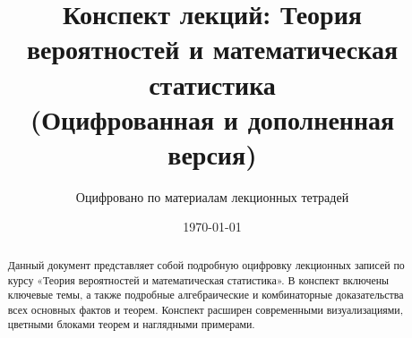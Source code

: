 \documentclass[12pt,a4paper]{article}
\title{\textbf{Конспект лекций: Теория вероятностей и математическая статистика}\\ \large (Оцифрованная и дополненная версия)}
\author{Оцифровано по материалам лекционных тетрадей}
\date{\today}
\begin{document}
\maketitle

\begin{abstract}
Данный документ представляет собой подробную оцифровку лекционных записей по курсу «Теория вероятностей и математическая статистика». В конспект включены ключевые темы, а также подробные алгебраические и комбинаторные доказательства всех основных фактов и теорем. Конспект расширен современными визуализациями, цветными блоками теорем и наглядными примерами.
\end{abstract}

\tableofcontents
\newpage








\end{document}
